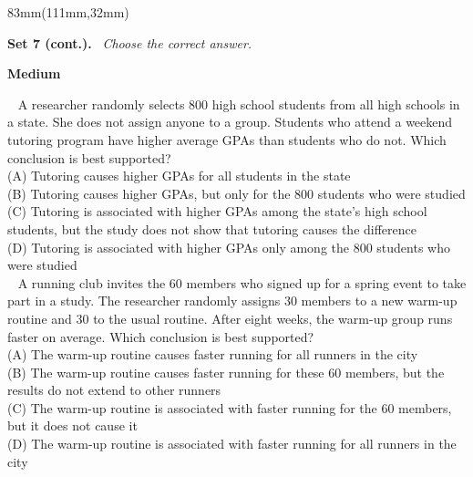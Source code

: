 \documentclass[a4paper]{article}
\newcommand{\RCOL}{111mm}
\newcommand{\COLW}{83mm}
\newcommand{\setkicker}[2]{%
{\sffamily\bfseries\fontsize{12}{14}\selectfont #1.}\ {\itshape\fontsize{11}{14}\selectfont\color{black!75} #2}\par\vspace{2mm}%
}
\newcommand{\pnum}[1]{\fcolorbox{ink}{white}{\sffamily\bfseries\fontsize{8}{8}\selectfont #1}~}
\newcommand{\satqw}[6]{%
\noindent\pnum{#1} #2\\[2mm]
\hspace*{7mm}(A) #3\\[1.6mm]
\hspace*{7mm}(B) #4\\[1.6mm]
\hspace*{7mm}(C) #5\\[1.6mm]
\hspace*{7mm}(D) #6\\[7mm]%
}
\begin{document}
\begin{textblock*}{\COLW}(\RCOL,32mm)
{\fontsize{10.3}{13}\selectfont
\setkicker{Set 7 (cont.)}{Choose the correct answer.}
{\sffamily\bfseries\color{accent}\fontsize{10.5}{12}\selectfont Medium}\par\vspace{1.5mm}
\satqw{2}{A researcher randomly selects 800 high school students from all high schools in a state. She does not assign anyone to a group. Students who attend a weekend tutoring program have higher average GPAs than students who do not. Which conclusion is best supported?}{Tutoring causes higher GPAs for all students in the state}{Tutoring causes higher GPAs, but only for the 800 students who were studied}{Tutoring is associated with higher GPAs among the state's high school students, but the study does not show that tutoring causes the difference}{Tutoring is associated with higher GPAs only among the 800 students who were studied}
\satqw{3}{A running club invites the 60 members who signed up for a spring event to take part in a study. The researcher randomly assigns 30 members to a new warm-up routine and 30 to the usual routine. After eight weeks, the warm-up group runs faster on average. Which conclusion is best supported?}{The warm-up routine causes faster running for all runners in the city}{The warm-up routine causes faster running for these 60 members, but the results do not extend to other runners}{The warm-up routine is associated with faster running for the 60 members, but it does not cause it}{The warm-up routine is associated with faster running for all runners in the city}
}
\end{textblock*}
\clearpage
\end{document}
